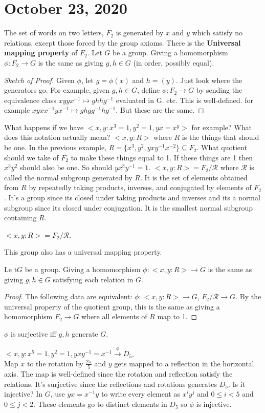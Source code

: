 \documentclass{article}
\newcommand{\vocab}[1]{\textbf{\color{blue!90}\boldmath #1}}
\newcommand{\ra}[1][]{\xrightarrow{#1}}
\begin{document}
\section{October 23, 2020}
The set of words on two letters, $F_2$ is generated by $x$ and $y$ which satisfy no relations, except those forced by the group axioms. There is the \vocab{Universal mapping property} of $F_2$. Let $G$ be a group. Giving a homomorphism $\phi:F_2\ra G$ is the same as giving $g,h\in G$ (in order, possibly equal).
\begin{proof}[Sketch of Proof]
Given $\phi$, let $g=\phi(x)$ and $h=(y)$. Just look where the generators go. For example, given $g,h\in G$, define $\phi:F_2\ra G$ by sending the equivalence class $xyyx^{-1}\mapsto ghhg^{-1}$ evaluated in G. etc. This is well-defined. for example $xyxx^{-1}yx^{-1}\mapsto ghgg^{-1}hg^{-1}$. But these are the same.
\end{proof}
What happens if we have $<x,y:x^3=1,y^2=1,yx=x^y>$ for example? What does this notation actually mean?  $<x,y:R>$ where $R$ is the things that should be one. In the previous example, $R=\{x^3,y^2,yxy^{-1}x^{-2}\}\subseteq F_2$. What quotient should we take of $F_2$ to make these things equal to 1. If these things are 1 then $x^3y^2$ should also be one. So should $yx^3y^{-1}=1$. $<x,y:R>=F_2/\mathcal{R}$ where $\mathcal{R}$ is called the normal subgroup generated by $R$. It is the set of elements obtained from $R$ by repeatedly taking products, inverses, and conjugated by elements of $F_2$. It's a group since its closed under taking products and inverses and its a normal subgroup since its closed under conjugation. It is the smallest normal subgroup containing $R$.
\begin{definition}
$<x,y:R>=F_2/\mathcal{R}$.
\end{definition}
This group also has a universal mapping property.
\begin{definition}
Le t$G$ be a group. Giving a homomorphism $\phi:<x,y:R>\ra G$ is the same as giving $g,h\in G$ satisfying each relation in $G$.
\end{definition}
\begin{proof}
The following data are equivalent: $\phi:<x,y:R>\ra G$, $F_2/\mathcal{R}\ra G$. By the universal property of the quotient group, this is the same as giving a homomorphism $F_2\ra G$ where all  elements of $R$ map to 1.
\end{proof}
$\phi$ is surjective iff $g,h$ generate $G$.
\begin{example}
$<x,y:x^5=1,y^2=1,yxy^{-1}=x^{-1}\ra[\phi]D_5$.\\
Map $x$ to the rotation by $\frac{2\pi}{5}$ and $y$ gets mapped to a reflection in the horizontal axis. The map is well-defined since the rotation and reflection satisfy the relations. It's surjective since the reflections and rotations generates $D_5$. Is it injective? In $G$, use $yx=x^{-1}y$ to write every element as $x^iy^j$ and $0\leq i<5$ and $0\leq j<2$. These elements go to distinct elements in $D_5$ so $\phi$ is injective.
\end{example}
\end{document}
